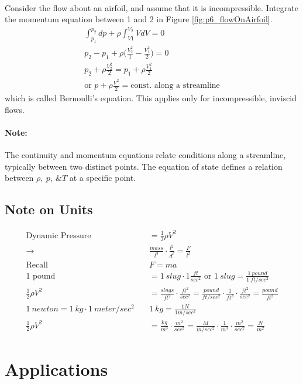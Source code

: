 \documentclass[draft=false, titlepage]{article}
\begin{document}
\paragraph*{} Consider the flow about an airfoil, and assume that it is incompressible. Integrate the momentum equation between 1 and 2 in Figure \ref{fig:p6_flowOnAirfoil}.
\begin{gather*}
\int_{p_1}^{p_2} dp + \rho \int_{V1}^{V_2} V dV = 0\\p_2 - p_1 + \rho\big(\frac{V_2^2}{1}-\frac{V_1^2}{2}\big) = 0\\
p_2 + \rho\frac{V_2^2}{2} = p_1 + \rho \frac{V_1^2}{2}\\
\text{or } \boxed{p + \rho \frac{V^2}{2} = \text{const. along a streamline}}
\label{eq:Bernoulli}
\end{gather*}
which is called Bernoulli's equation. This applies only for incompressible, inviscid flows.
\paragraph*{Note:} The continuity and momentum equations relate conditions along a streamline, typically between two distinct points. The equation of state defines a relation between $\rho,\ p,\ \& T$ at a specific point.

\subsection{Note on Units}
\begin{align*}
\text{Dynamic Pressure} &\quad = \frac{1}{2}\rho V^2\\
\rightarrow &\quad \frac{mass}{l^3} \cdot \frac{l^2}{d^t} = \frac{F}{l^2}\\
\text{Recall }&\quad F=ma\\
\text{1 pound} &\quad = 1\ slug \cdot 1\frac{ft}{sec^2} \text{ or } 1\ slug = \frac{1\ pound}{1\ ft/sec^2}\\
\frac{1}{2}\rho V^2 &\quad = \frac{slugs}{ft^2} \cdot \frac{ft^2}{sec^2} = \frac{pound}{ft/sec^2}\cdot \frac{1}{ft^3}\cdot \frac{ft^2}{sec^2} = \frac{pound}{ft^2}\\
1\ newton = 1\ kg \cdot 1\ meter/sec^2 &\quad 1\ kg = \frac{1N}{1m/sec^2}\\
\frac{1}{2}\rho V^2 &\quad = \frac{kg}{m^3}\cdot \frac{m^2}{sec^2} = \frac{M}{m/sec^2}\cdot \frac{1}{m^3}\cdot \frac{m^2}{sec^2} = \frac{N}{m^2}
\end{align*}

\section{Applications}
\end{document}

